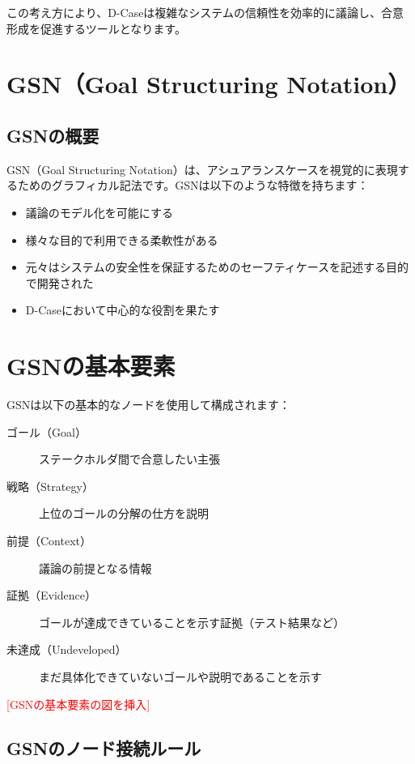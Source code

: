 この考え方により、D-Caseは複雑なシステムの信頼性を効率的に議論し、合意形成を促進するツールとなります。

\section{GSN（Goal Structuring Notation）}

\subsection{GSNの概要}

GSN（Goal Structuring Notation）は、アシュアランスケースを視覚的に表現するためのグラフィカル記法です。GSNは以下のような特徴を持ちます：

\begin{itemize}
    \item 議論のモデル化を可能にする
    \item 様々な目的で利用できる柔軟性がある
    \item 元々はシステムの安全性を保証するためのセーフティケースを記述する目的で開発された
    \item D-Caseにおいて中心的な役割を果たす
\end{itemize}

\section{GSNの基本要素}

GSNは以下の基本的なノードを使用して構成されます：

\begin{description}
    \item[ゴール（Goal）] ステークホルダ間で合意したい主張
    \item[戦略（Strategy）] 上位のゴールの分解の仕方を説明
    \item[前提（Context）] 議論の前提となる情報
    \item[証拠（Evidence）] ゴールが達成できていることを示す証拠（テスト結果など）
    \item[未達成（Undeveloped）] まだ具体化できていないゴールや説明であることを示す
\end{description}

\textcolor{red}{[GSNの基本要素の図を挿入]}

\subsection{GSNのノード接続ルール}

